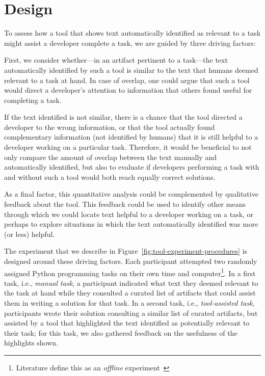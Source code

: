 
\section{Design}
\label{cp6:design}



To assess how a tool that shows text automatically identified as relevant to a task
might assist a developer complete a task, we are guided by three driving factors:


First, we consider whether---in an artifact pertinent to a task---the  text automatically identified by such a tool is similar to the text that humans deemed relevant to a task at hand. 
In case of overlap, one could argue that such a tool  
would direct a developer's attention to information that others found useful for completing a task.


If the text identified is not similar, there is a chance that the tool directed a developer to the wrong information, or that 
the tool actually found complementary information (not identified by humans) that it is still helpful to a developer working on a particular task. 
Therefore, it would be beneficial to not only compare the amount of overlap between the text manually
and automatically identified, but also to evaluate if developers performing a task with and without such a tool would 
both reach equally correct solutions.


As a final factor, this quantitative analysis could be complemented by qualitative feedback about the tool. 
This feedback could be used to identify other means through which we could locate 
text helpful to a developer working on a task, or perhaps to explore
situations in which the text automatically identified 
was more (or less) helpful.



The experiment that we describe in Figure~\ref{fig:tool-experiment-procedures} is designed around these driving factors.  
Each participant attempted two randomly assigned Python programming tasks on their own time and computer\footnote{Literature define this as an \textit{offline} experiment~\cite{wohlin2012, DeLucia2012}}.
In a first task, i.e., \textit{manual task}, a participant indicated 
what text they deemed relevant to the task at hand while 
they consulted a curated list of artifacts that could assist them in writing a solution for that task.
In a second task, i.e., \textit{tool-assisted task},
participants wrote their solution consulting a similar list of curated artifacts, but
assisted by a tool that highlighted the text identified as potentially relevant to their task; for this task, we also gathered feedback on the usefulness of the highlights shown.


